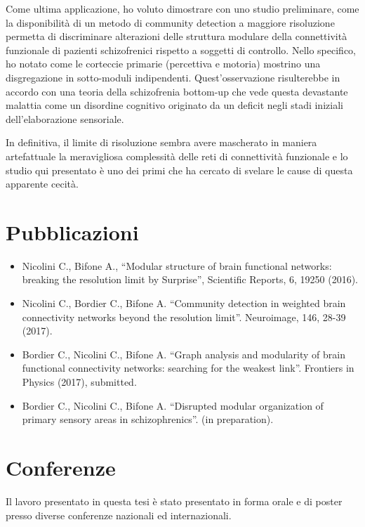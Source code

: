 Come ultima applicazione, ho voluto dimostrare con uno studio preliminare, come la disponibilità di un metodo di community detection a maggiore risoluzione permetta di discriminare alterazioni delle struttura modulare della connettività funzionale di pazienti schizofrenici rispetto a soggetti di controllo. Nello specifico, ho notato come le corteccie primarie (percettiva e motoria) mostrino una disgregazione in sotto-moduli indipendenti.
Quest'osservazione risulterebbe in accordo con una teoria della schizofrenia bottom-up che vede questa devastante malattia come un disordine cognitivo originato da un deficit negli stadi iniziali dell'elaborazione sensoriale.

In definitiva, il limite di risoluzione sembra avere mascherato in maniera artefattuale la meravigliosa complessità delle reti di connettività funzionale e lo studio qui presentato è uno dei primi che ha cercato di svelare le cause di questa apparente cecità.

\section*{Pubblicazioni}

\begin{itemize}
	\item Nicolini C., Bifone A., ``Modular structure of brain functional networks: breaking the resolution limit by Surprise'', Scientific Reports, 6, 19250 (2016).
	\item Nicolini C., Bordier C., Bifone A. ``Community detection in weighted brain connectivity networks beyond the resolution limit''. Neuroimage, 146, 28-39 (2017).
	\item Bordier C., Nicolini C., Bifone A. ``Graph analysis and modularity of brain functional connectivity networks: searching for the weakest link''. Frontiers in Physics (2017), submitted.
	\item Bordier C., Nicolini C., Bifone A. ``Disrupted modular organization of primary sensory areas in schizophrenics''. (in preparation).
\end{itemize}

\section*{Conferenze}
Il lavoro presentato in questa tesi è stato presentato in forma orale e di poster presso diverse conferenze nazionali ed internazionali.

